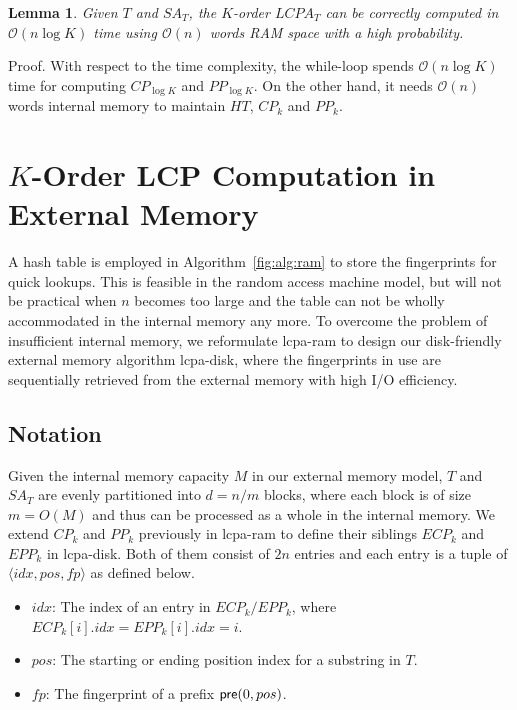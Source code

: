 \documentclass{llncs}
\newtheorem{Lemma}{Lemma}
\begin{document}
\begin{Lemma}
\label{thm:lcp:ram}
Given $T$ and $SA_T$, the $K$-order $LCPA_T$ can be correctly computed in $\mathcal{O}(n\log K)$ time using $\mathcal{O}(n)$ words RAM space with a high probability.
\end{Lemma}
Proof. With respect to the time complexity, the while-loop spends $\mathcal{O}(n\log K)$ time for computing $CP_{\log K}$ and $PP_{\log K}$. On the other hand, it needs $\mathcal{O}(n)$ words internal memory to maintain $HT$, $CP_k$ and $PP_k$.


\section{$K$-Order LCP Computation in External Memory}\label{sec:construction_in_em}

A hash table is employed in Algorithm~\ref{fig:alg:ram} to store the fingerprints for quick lookups. This is feasible in the random access machine model, but will not be practical when $n$ becomes too large and the table can not be wholly accommodated in the internal memory any more. To overcome the problem of insufficient internal memory, we reformulate lcpa-ram to design our disk-friendly external memory algorithm lcpa-disk, where the fingerprints in use are sequentially retrieved from the external memory with high I/O efficiency.

\subsection{Notation}

Given the internal memory capacity $M$ in our external memory model, $T$ and $SA_T$ are evenly partitioned into $d=n/m$ blocks, where each block is of size $m=O(M)$ and thus can be processed as a whole in the internal memory. We extend $CP_k$ and $PP_k$ previously in lcpa-ram to define their siblings $ECP_k$ and $EPP_k$ in lcpa-disk. Both of them consist of $2n$ entries and each entry is a tuple of $\langle idx, pos, fp \rangle$ as defined below.
\begin{itemize}
\item $idx$: The index of an entry in $ECP_k/EPP_k$, where $ECP_k[i].idx=EPP_k[i].idx=i$.
\item $pos$: The starting or ending position index for a substring in $T$.
\item $fp$: The fingerprint of a prefix ${\sf pre}(0,pos)$.
\end{itemize}
\end{document}
